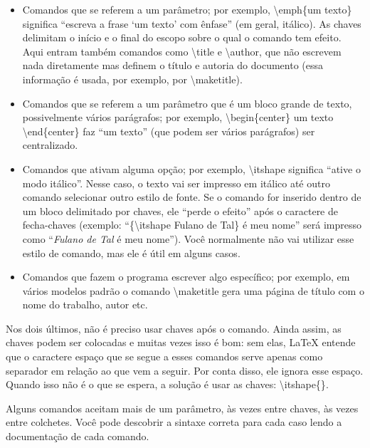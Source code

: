 \begin{itemize}
\item Comandos que se referem a um parâmetro; por exemplo,
\textsf{\textbackslash{}emph\{um texto\}} significa ``escreva a frase
`um texto' com ênfase'' (em geral, itálico). As chaves delimitam o início
e o final do escopo sobre o qual o comando tem efeito. Aqui entram também
comandos como \textsf{\textbackslash{}title} e \textsf{\textbackslash{}author},
que não escrevem nada diretamente mas definem o título e autoria do documento
(essa informação é usada, por exemplo, por \textsf{\textbackslash{}maketitle}).

\item Comandos que se referem a um parâmetro que é um bloco grande de
texto, possivelmente vários parágrafos; por exemplo,
\textsf{\textbackslash{}begin\{center\} um texto
\textbackslash{}end\{center\}} faz ``um texto'' (que podem ser
vários parágrafos) ser centralizado.

\item Comandos que ativam alguma opção; por exemplo,
\textsf{\textbackslash{}itshape} significa ``ative o modo itálico''.
Nesse caso, o texto vai ser impresso em itálico até outro comando selecionar
outro estilo de fonte. Se o comando for inserido dentro de um bloco
delimitado por chaves, ele ``perde o efeito'' após o caractere de fecha-chaves
(exemplo: ``\textsf{\{\textbackslash{}itshape Fulano de Tal\} é meu nome}''
será impresso como ``\textit{Fulano de Tal} é meu nome''). Você normalmente
não vai utilizar esse estilo de comando, mas ele é útil em alguns casos.

\item Comandos que fazem o programa escrever algo específico; por exemplo,
em vários modelos padrão o comando \textsf{\textbackslash{}maketitle} gera
uma página de título com o nome do trabalho, autor etc.
\end{itemize}

Nos dois últimos, não é preciso usar chaves após o comando. Ainda assim, as
chaves podem ser colocadas e muitas vezes isso é bom: sem elas, \LaTeX{}
entende que o caractere espaço que se segue a esses comandos serve apenas
como separador em relação ao que vem a seguir. Por conta disso, ele ignora
esse espaço. Quando isso não é o que se espera, a solução é usar as chaves:
\textsf{\textbackslash{}itshape\{\}}.

Alguns comandos aceitam mais de um parâmetro, às vezes entre chaves, às
vezes entre colchetes. Você pode descobrir a sintaxe correta para cada caso
lendo a documentação de cada comando.

